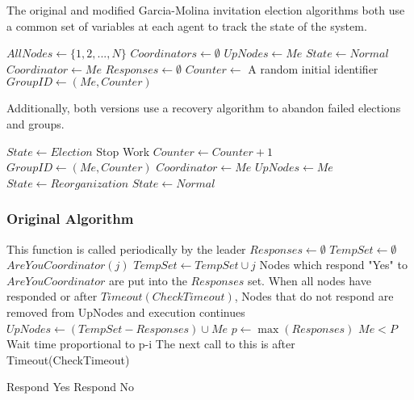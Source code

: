 The original and modified Garcia-Molina invitation election algorithms both use a common set of variables at each agent to track the state of the system.

\begin{algorithmic}[1]
\small
\State $AllNodes \gets \{ 1, 2, ..., N \}$
\State $Coordinators \gets \emptyset$
\State $UpNodes \gets { Me }$
\State $State \gets Normal$
\State $Coordinator \gets Me$
\State $Responses \gets \emptyset$
\State $Counter \gets$ A random initial identifier
\State $GroupID \gets (Me,Counter)$

\end{algorithmic}

Additionally, both versions use a recovery algorithm to abandon failed elections and groups.

\begin{algorithmic}[1]
\small
{}
    \State $State \gets Election$
    \State Stop Work
    \State $Counter \gets Counter + 1$
    \State $GroupID \gets (Me,Counter)$
    \State $Coordinator \gets Me$
    \State $UpNodes \gets {Me}$
    \State $State \gets Reorganization$
    \State $State \gets Normal$
\EndFunction
\end{algorithmic}

\subsubsection{Original Algorithm}

\begin{algorithmic}[1]
\small
{}
    \State This function is called periodically by the leader
        \State $Responses \gets \emptyset$
        \State $TempSet \gets \emptyset$
            \State $AreYouCoordinator(j)$
            \State $TempSet \gets TempSet \cup j$
        \EndFor
        \State Nodes which respond "Yes" to $AreYouCoordinator$ are put into the $Responses$ set. When all nodes have responded or after $Timeout(CheckTimeout)$, Nodes that do not respond are removed from UpNodes and execution continues
        \State $UpNodes \gets (TempSet-Responses) \cup {Me}$
            \Return
        \EndIf
        \State $p \gets \max(Responses)$
        \If $Me < P$
            \State Wait time proportional to p-i
        \EndIf
    \EndIf
    \State The next call to this is after Timeout(CheckTimeout)
\EndFunction

\State

        \State Respond Yes
    \Else
        \State Respond No
    \EndIf
\EndFunction

\end{algorithmic}

